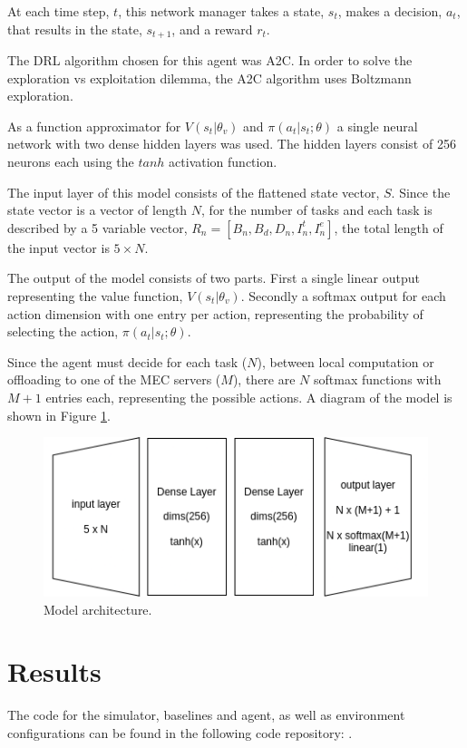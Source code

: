 \documentclass[conference]{IEEEtran}
\begin{document}
At each time step, $t$, this network manager takes a state, $s_t$, makes a decision, $a_t$, that results in the state, $s_{t+1}$, and a reward $r_t$.

The \acrshort{DRL} algorithm chosen for this agent was \acrshort{A2C}. In order to solve the exploration vs exploitation dilemma, the \acrshort{A2C} algorithm uses Boltzmann exploration.

As a function approximator for $V(s_t | \theta_v)$ and $\pi(a_t | s_t; \theta)$ a single neural network with two dense hidden layers was used. The hidden layers consist of 256 neurons each using the $tanh$ activation function. 

The input layer of this model consists of the flattened state vector, $S$. Since the state vector is a vector of length $N$, for the number of tasks and each task is described by a 5 variable vector, $R_n = [B_n, B_d, D_n, I_n^t, I_n^e]$, the total length of the input vector is $5 \times N$. 

The output of the model consists of two parts. First a single linear output representing the value function, $V(s_t | \theta_v)$. Secondly a softmax output for each action dimension with one entry per action, representing the probability of selecting the action, $\pi(a_t | s_t; \theta)$. 

Since the agent must decide for each task ($N$), between local computation or offloading to one of the MEC servers ($M$), there are $N$ softmax functions with $M+1$ entries each, representing the possible actions. A diagram of the model is shown in Figure \ref{fig:model}.

\begin{figure}[H]
  \centering
  \includegraphics[width=\linewidth]{images/model_arch.png}
  \caption{Model architecture.}
  \label{fig:model}
\end{figure}

\section{Results}
\label{sec:results}
The code for the simulator, baselines and agent, as well as environment configurations can be found in the following code repository: .
\end{document}
